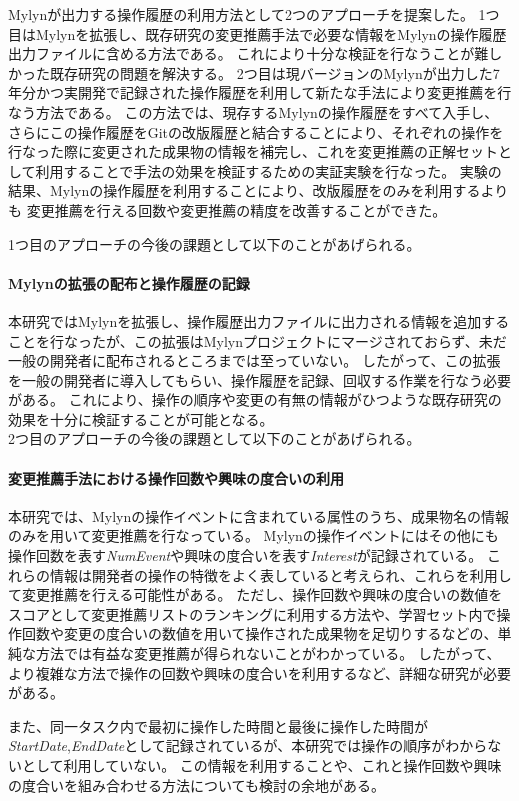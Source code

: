 \documentclass[a4paper]{jsbook}
\begin{document}
Mylynが出力する操作履歴の利用方法として2つのアプローチを提案した。
1つ目はMylynを拡張し、既存研究の変更推薦手法で必要な情報をMylynの操作履歴出力ファイルに含める方法である。
これにより十分な検証を行なうことが難しかった既存研究の問題を解決する。
2つ目は現バージョンのMylynが出力した7年分かつ実開発で記録された操作履歴を利用して新たな手法により変更推薦を行なう方法である。
この方法では、現存するMylynの操作履歴をすべて入手し、さらにこの操作履歴をGitの改版履歴と結合することにより、それぞれの操作を行なった際に変更された成果物の情報を補完し、これを変更推薦の正解セットとして利用することで手法の効果を検証するための実証実験を行なった。
実験の結果、Mylynの操作履歴を利用することにより、改版履歴をのみを利用するよりも
変更推薦を行える回数や変更推薦の精度を改善することができた。

1つ目のアプローチの今後の課題として以下のことがあげられる。
\paragraph{Mylynの拡張の配布と操作履歴の記録}
本研究ではMylynを拡張し、操作履歴出力ファイルに出力される情報を追加することを行なったが、この拡張はMylynプロジェクトにマージされておらず、未だ一般の開発者に配布されるところまでは至っていない。
したがって、この拡張を一般の開発者に導入してもらい、操作履歴を記録、回収する作業を行なう必要がある。
これにより、操作の順序や変更の有無の情報がひつような既存研究の効果を十分に検証することが可能となる。
\\

2つ目のアプローチの今後の課題として以下のことがあげられる。
\paragraph{変更推薦手法における操作回数や興味の度合いの利用}
本研究では、Mylynの操作イベントに含まれている属性のうち、成果物名の情報のみを用いて変更推薦を行なっている。
Mylynの操作イベントにはその他にも操作回数を表す{\it NumEvent}や興味の度合いを表す{\it Interest}が記録されている。
これらの情報は開発者の操作の特徴をよく表していると考えられ、これらを利用して変更推薦を行える可能性がある。
ただし、操作回数や興味の度合いの数値をスコアとして変更推薦リストのランキングに利用する方法や、学習セット内で操作回数や変更の度合いの数値を用いて操作された成果物を足切りするなどの、単純な方法では有益な変更推薦が得られないことがわかっている。
したがって、より複雑な方法で操作の回数や興味の度合いを利用するなど、詳細な研究が必要がある。

また、同一タスク内で最初に操作した時間と最後に操作した時間が{\it StartDate},{\it EndDate}として記録されているが、本研究では操作の順序がわからないとして利用していない。
この情報を利用することや、これと操作回数や興味の度合いを組み合わせる方法についても検討の余地がある。
\end{document}
